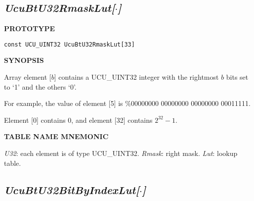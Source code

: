 \subsection[\emph{UcuBtU32RmaskLut[\protect\mbox{\protect$\cdot$}]}]
           {\emph{UcuBtU32RmaskLut[\protect\mbox{\protect\boldmath $\cdot$}]}}
\label{cbsf0:sctb0:srml0}

%

\noindent\textbf{PROTOTYPE}
\begin {list}{}{\setlength{\leftmargin}{0.25in}\setlength{\topsep}{0.0in}}
\item
\begin{verbatim}
const UCU_UINT32 UcuBtU32RmaskLut[33]
\end{verbatim}
\end{list}
\vspace{2.8ex}

\noindent\textbf{SYNOPSIS}
\begin{list}{}{\setlength{\leftmargin}{0.25in}\setlength{\topsep}{0.0in}}
\item Array element [$b$] contains a UCU\_UINT32 integer with the
      rightmost $b$ bits set to `1' and the others `0'.
\item For example, the value of element [5] is \%00000000 00000000 00000000 00011111.
\item Element [0] contains 0, and element [32] contains $2^{32}-1$.
\end{list}
\vspace{2.8ex}

\noindent\textbf{TABLE NAME MNEMONIC}
\begin{list}{}{\setlength{\leftmargin}{0.25in}\setlength{\topsep}{0.0in}}
\item \emph{U32}: each element is of type UCU\_UINT32.
      \emph{Rmask}: right mask.
      \emph{Lut}: lookup table.
\end{list}


\subsection[\emph{UcuBtU32BitByIndexLut[\protect\mbox{\protect$\cdot$}]}]
           {\emph{UcuBtU32BitByIndexLut[\protect\mbox{\protect\boldmath $\cdot$}]}}
\label{cbsf0:sctb0:sbbi0}

